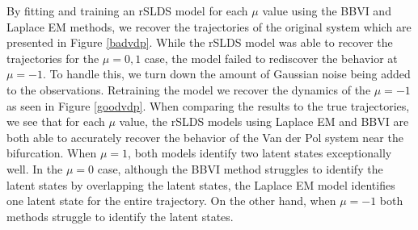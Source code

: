 By fitting and training an rSLDS model for each $\mu$ value using the BBVI and Laplace EM methods, we recover the trajectories of the original system which are presented in Figure \ref{badvdp}. While the rSLDS model was able to recover the trajectories for the $\mu=0,1$ case, the model failed to rediscover the behavior at $\mu = -1$. To handle this, we turn down the amount of Gaussian noise being added to the observations. Retraining the model we recover the dynamics of the $\mu = -1$ as seen in Figure \ref{goodvdp}. When comparing the results to the true trajectories, we see that for each $\mu$ value, the rSLDS models using Laplace EM and BBVI are both able to accurately recover the behavior of the Van der Pol system near the bifurcation. When $\mu = 1$, both models identify two latent states exceptionally well. In the $\mu = 0$ case, although the BBVI method struggles to identify the latent states by overlapping the latent states, the Laplace EM model identifies one latent state for the entire trajectory. On the other hand, when $\mu = -1$ both methods struggle to identify the latent states.
